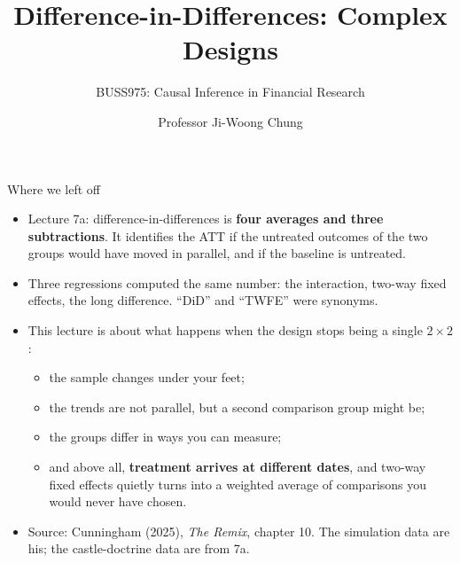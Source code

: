 \documentclass[
  11pt,
  ignorenonframetext,
  aspectratio=169,
]{beamer}
\title{\texorpdfstring{Difference-in-Differences: Complex
Designs}{Difference-in-Differences: Complex Designs}}
\subtitle{\texorpdfstring{BUSS975: Causal Inference in Financial
Research}{BUSS975: Causal Inference in Financial Research}}
\author{Professor Ji-Woong Chung}
\date{}
\institute{Korea University}
\providecommand{\tightlist}{%
  \setlength{\itemsep}{0pt}\setlength{\parskip}{0pt}}
\begin{document}
\frame{\titlepage}


\begin{frame}{Where we left off}
\protect{}\label{where-we-left-off}
\begin{itemize}
\tightlist
\item
  Lecture 7a: difference-in-differences is \textbf{four averages and
  three subtractions}. It identifies the ATT if the untreated outcomes
  of the two groups would have moved in parallel, and if the baseline is
  untreated.
\item
  Three regressions computed the same number: the interaction, two-way
  fixed effects, the long difference. ``DiD'' and ``TWFE'' were
  synonyms.
\end{itemize}

\vspace{0.4em}

\begin{itemize}
\tightlist
\item
  This lecture is about what happens when the design stops being a
  single \(2 \times 2\):

  \begin{itemize}
  \tightlist
  \item
    the sample changes under your feet;
  \item
    the trends are not parallel, but a second comparison group might be;
  \item
    the groups differ in ways you can measure;
  \item
    and above all, \textbf{treatment arrives at different dates}, and
    two-way fixed effects quietly turns into a weighted average of
    comparisons you would never have chosen.
  \end{itemize}
\item
  Source: Cunningham (2025), \emph{The Remix}, chapter 10. The
  simulation data are his; the castle-doctrine data are from 7a.
\end{itemize}
\end{frame}
\end{document}
